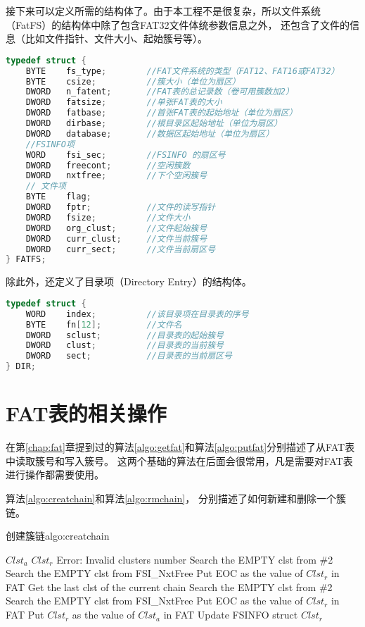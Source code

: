 接下来可以定义所需的结构体了。由于本工程不是很复杂，所以文件系统（FatFS）的结构体中除了包含FAT32文件体统参数信息之外，
还包含了文件的信息（比如文件指针、文件大小、起始簇号等）。
\begin{lstlisting}[language={C}, caption={文件系统的结构体}]
typedef struct {
	BYTE	fs_type;        //FAT文件系统的类型（FAT12、FAT16或FAT32）
	BYTE	csize;          //簇大小（单位为扇区）
	DWORD	n_fatent;       //FAT表的总记录数（卷可用簇数加2）
    DWORD   fatsize;        //单张FAT表的大小
	DWORD	fatbase;        //首张FAT表的起始地址（单位为扇区）
	DWORD	dirbase;        //根目录区起始地址（单位为扇区）
	DWORD	database;       //数据区起始地址（单位为扇区）
    //FSINFO项
    WORD    fsi_sec;        //FSINFO 的扇区号
    DWORD   freecont;       //空闲簇数
    DWORD   nxtfree;        //下个空闲簇号
    // 文件项
    BYTE    flag;
    DWORD	fptr;           //文件的读写指针
	DWORD	fsize;          //文件大小
	DWORD	org_clust;      //文件起始簇号
	DWORD	curr_clust;     //文件当前簇号
	DWORD	curr_sect;		//文件当前扇区号
} FATFS;

\end{lstlisting}
除此外，还定义了目录项（Directory Entry）的结构体。
\begin{lstlisting}[language={C}, caption={目录项的结构体}]
typedef struct {
	WORD	index;          //该目录项在目录表的序号
	BYTE	fn[12];         //文件名
	DWORD	sclust;         //目录表的起始簇号
	DWORD	clust;          //目录表的当前簇号
	DWORD	sect;           //目录表的当前扇区号
} DIR;
\end{lstlisting}
\section{FAT表的相关操作}
\label{sec:fatfunc}
在第\ref{chap:fat}章提到过的算法\ref{algo:getfat}和算法\ref{algo:putfat}分别描述了从FAT表中读取簇号和写入簇号。
这两个基础的算法在后面会很常用，凡是需要对FAT表进行操作都需要使用。

算法\ref{algo:creatchain}和算法\ref{algo:rmchain}，
分别描述了如何新建和删除一个簇链。
\begin{balgo}{创建簇链}{algo:creatchain}
\begin{algorithmic}[1]
\Require $Clst_a$
\Ensure $Clst_r$
    \State \Return Error: Invalid clusters number
        \State Search the EMPTY clst from \#2
    \Else
        \State Search the EMPTY clst from FSI\_NxtFree
    \EndIf
    \State Put EOC as the value of $Clst_r$ in FAT
    \State Get the last clst of the current chain
        \State Search the EMPTY clst from \#2
    \Else
        \State Search the EMPTY clst from FSI\_NxtFree
    \EndIf
    \State Put EOC as the value of $Clst_r$ in FAT
    \State Put $Clst_r$ as the value of $Clst_a$ in FAT
\EndIf
\State Update FSINFO struct
\State\Return $Clst_r$
\end{algorithmic}
\end{balgo}

